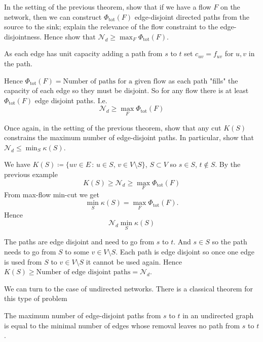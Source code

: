 \documentclass[10pt, a4paper]{article}
\begin{document}
\begin{example}
    In the setting of the previous theorem,
    show that if we have a flow $F$ on the network,
    then we can construct $\Phi_{\text{tot}}(F)$ edge-disjoint directed paths from the source to the sink;
    explain the relevance of the flow constraint to the edge-disjointness.
    Hence show that $\mathcal{N}_d \geq \max_{F}\Phi_{\text{tot}}(F)$.

    \begin{solution}
        As each edge has unit capacity adding a path from $s$ to $t$ set $c_{uv} = f_{uv}$ for $u, v$ in the path.

        Hence $\Phi_{\text{tot}}(F) = \text{Number of paths for a given flow}$ as each path "fills" the capacity of each edge so they must be disjoint.
        So for any flow there is at least $\Phi_{\text{tot}}(F)$ edge disjoint paths.
        I.e.
        \[
        \mathcal{N}_d \geq \max_{F}\Phi_{\text{tot}}(F)
        \]
    \end{solution}
\end{example}

\begin{example}
    Once again,
    in the setting of the previous theorem,
    show that any cut $K(S)$ constrains the maximum number of edge-disjoint paths.
    In particular,
    show that $\mathcal{N}_d \leq \min_{S}\kappa(S)$.

    \begin{solution}
        We have $K(S) \coloneqq \{uv \in E\,:\, u \in S,\, v \in V \setminus S\}$,
        $S \subset V$ so $s \in S$,
        $t \notin S$.
        By the previous example
        \[
        K(S) \geq \mathcal{N}_d \geq \max_F\Phi_{\text{tot}}(F)
        \]
        From max-flow min-cut we get
        \[
        \min_S\kappa(S) = \max_F\Phi_{\text{tot}}(F).
        \]
        Hence
        \[
        \mathcal{N}_d \min_S\kappa(S)
        \]
        

        The paths are edge disjoint and need to go from $s$ to $t$.
        And $s \in S$ so the path needs to go from $S$ to some $v \in V \setminus S$.
        Each path is edge disjoint so once one edge is used from $S$ to $v \in V \setminus S$ it cannot be used again.
        Hence $K(S) \geq \text{Number of edge disjoint paths} = \mathcal{N}_d$.
    \end{solution}
\end{example}

We can turn to the case of undirected networks.
There is a classical theorem for this type of problem
\begin{theorem}
    The maximum number of edge-disjoint paths from $s$ to $t$ in an undirected graph is equal to the minimal number of edges whose removal leaves no path from $s$ to $t$.
\end{theorem}
\end{document}
